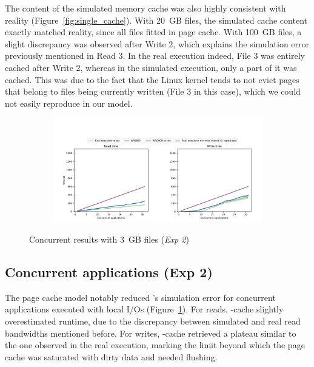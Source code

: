 The content of the simulated memory cache was also highly
consistent with reality (Figure~\ref{fig:single_cache}). With 20~GB
files, the simulated cache content exactly matched reality, since
all files fitted in page cache. With 100~GB files, a slight
discrepancy was observed after Write 2, which explains the
simulation error previously mentioned in Read 3. In the real
execution indeed, File 3 was entirely cached after Write 2, whereas
in the simulated execution, only a part of it was cached. This was
due to the fact that the Linux kernel tends to not evict pages that
belong to files being currently written (File 3 in this case),
which we could not easily reproduce in our model.

\begin{figure}
    \begin{subfigure}{\linewidth}
        \centering
        \includegraphics[width=\linewidth]{result/multi/figures/multi_local.pdf}
    \end{subfigure}
    \caption{Concurrent results with 3~GB files (\textit{Exp 2})}
    \label{fig:multi_local}
\end{figure}

\subsection{Concurrent applications (Exp 2)}

The page cache model notably reduced \wrench's simulation error
for concurrent applications executed with local I/Os
(Figure~\ref{fig:multi_local}). For reads, \wrench-cache
slightly overestimated runtime, due to the discrepancy between
simulated and real read bandwidths mentioned before. 
For writes, \wrench-cache
retrieved a plateau similar to the one observed in the real
execution, marking the limit beyond which the page cache was
saturated with dirty data and needed flushing.

